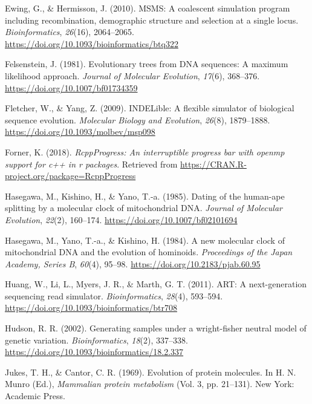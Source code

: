\documentclass[12pt,]{article}
\begin{document}
\leavevmode\hypertarget{ref-Ewing_2010}{}%
Ewing, G., \& Hermisson, J. (2010). MSMS: A coalescent simulation
program including recombination, demographic structure and selection at
a single locus. \emph{Bioinformatics}, \emph{26}(16), 2064--2065.
\url{https://doi.org/10.1093/bioinformatics/btq322}

\leavevmode\hypertarget{ref-Felsenstein_1981}{}%
Felsenstein, J. (1981). Evolutionary trees from DNA sequences: A maximum
likelihood approach. \emph{Journal of Molecular Evolution},
\emph{17}(6), 368--376. \url{https://doi.org/10.1007/bf01734359}

\leavevmode\hypertarget{ref-Fletcher_2009}{}%
Fletcher, W., \& Yang, Z. (2009). INDELible: A flexible simulator of
biological sequence evolution. \emph{Molecular Biology and Evolution},
\emph{26}(8), 1879--1888. \url{https://doi.org/10.1093/molbev/msp098}

\leavevmode\hypertarget{ref-Forner_2018}{}%
Forner, K. (2018). \emph{RcppProgress: An interruptible progress bar
with openmp support for c++ in r packages}. Retrieved from
\url{https://CRAN.R-project.org/package=RcppProgress}

\leavevmode\hypertarget{ref-Hasegawa_1985}{}%
Hasegawa, M., Kishino, H., \& Yano, T.-a. (1985). Dating of the
human-ape splitting by a molecular clock of mitochondrial DNA.
\emph{Journal of Molecular Evolution}, \emph{22}(2), 160--174.
\url{https://doi.org/10.1007/bf02101694}

\leavevmode\hypertarget{ref-Hasegawa_1984}{}%
Hasegawa, M., Yano, T.-a., \& Kishino, H. (1984). A new molecular clock
of mitochondrial DNA and the evolution of hominoids. \emph{Proceedings
of the Japan Academy, Series B}, \emph{60}(4), 95--98.
\url{https://doi.org/10.2183/pjab.60.95}

\leavevmode\hypertarget{ref-Huang_2011}{}%
Huang, W., Li, L., Myers, J. R., \& Marth, G. T. (2011). ART: A
next-generation sequencing read simulator. \emph{Bioinformatics},
\emph{28}(4), 593--594.
\url{https://doi.org/10.1093/bioinformatics/btr708}

\leavevmode\hypertarget{ref-Hudson_2002}{}%
Hudson, R. R. (2002). Generating samples under a wright-fisher neutral
model of genetic variation. \emph{Bioinformatics}, \emph{18}(2),
337--338. \url{https://doi.org/10.1093/bioinformatics/18.2.337}

\leavevmode\hypertarget{ref-JC69}{}%
Jukes, T. H., \& Cantor, C. R. (1969). Evolution of protein molecules.
In H. N. Munro (Ed.), \emph{Mammalian protein metabolism} (Vol. 3, pp.
21--131). New York: Academic Press.
\end{document}
